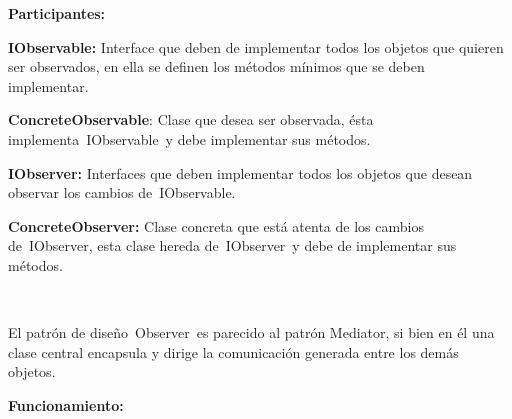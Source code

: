 \documentclass[12pt]{article}
\begin{document}
\begin{multicols}{2}
{\fontsize{9pt}{10.8pt}\selectfont \textbf{Participantes: }\par}\par

{\fontsize{9pt}{10.8pt}\selectfont \textbf{IObservable:} Interface que deben de implementar todos los objetos que quieren ser observados, en ella se definen los métodos mínimos que se deben implementar. \par}\par

{\fontsize{9pt}{10.8pt}\selectfont \textbf{ConcreteObservable}: Clase que desea ser observada, ésta implementa IObservable y debe implementar sus métodos. \par}\par

{\fontsize{9pt}{10.8pt}\selectfont \textbf{IObserver:} Interfaces que deben implementar todos los objetos que desean observar los cambios de IObservable. \par}\par

{\fontsize{9pt}{10.8pt}\selectfont \textbf{ConcreteObserver:} Clase concreta que está atenta de los cambios de IObserver, esta clase hereda de IObserver y debe de implementar sus métodos. \par}\par

{\fontsize{9pt}{10.8pt}\selectfont  \par}\par


\vspace{\baselineskip}

\vspace{\baselineskip}
{\fontsize{9pt}{10.8pt}\selectfont El patrón de diseño Observer es parecido al patrón Mediator, si bien en él una clase central encapsula y dirige la comunicación generada entre los demás objetos. \par}\par


\vspace{\baselineskip}

\vspace{\baselineskip}

\vspace{\baselineskip}

\vspace{\baselineskip}

\vspace{\baselineskip}

\vspace{\baselineskip}
{\fontsize{10pt}{12.0pt}\selectfont \textbf{Funcionamiento: }\par}\par




\end{multicols}
\end{document}
